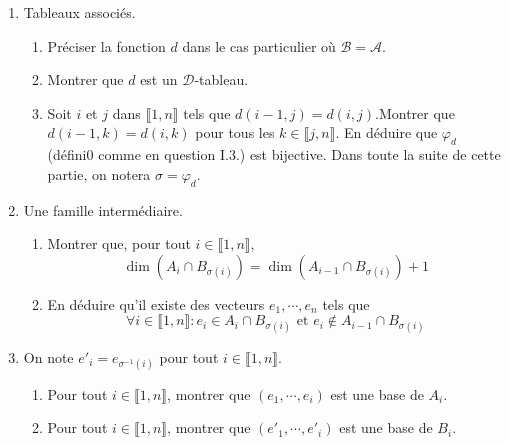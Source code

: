 \begin{enumerate}
  \item Tableaux associés.
\begin{enumerate}
  \item   Préciser la fonction $d$ dans le cas particulier où $\mathcal{B} = \mathcal{A}$.
  \item Montrer que $d$ est un $\mathcal{D}$-tableau.
  \item Soit $i$ et $j$ dans $\llbracket 1,n \rrbracket$ tels que $d(i-1,j)=d(i,j)$.\newline Montrer que $d(i-1,k)=d(i,k)$ pour tous les $k\in \llbracket j,n \rrbracket$. En déduire que $\varphi_d$ (défini0 comme en question I.3.) est bijective.
  \newline Dans toute la suite de cette partie, on notera $\sigma = \varphi_d$.
\end{enumerate}

  \item Une famille intermédiaire.
\begin{enumerate}
  \item Montrer que, pour tout $i \in \llbracket 1,n \rrbracket$,
  \begin{displaymath}
    \dim(A_i \cap B_{\sigma(i)}) = \dim(A_{i-1} \cap B_{\sigma(i)}) +1
  \end{displaymath}
  \item En déduire qu'il existe des vecteurs $e_1,\cdots,e_n$ tels que 
\begin{displaymath}
  \forall i \in \llbracket 1,n \rrbracket: e_i\in A_i \cap B_{\sigma(i)} \text{ et } e_i \notin A_{i-1} \cap B_{\sigma(i)}
\end{displaymath}
\end{enumerate}
  
  \item On note $e'_i = e_{\sigma^{-1}(i)}$ pour tout $i \in \llbracket 1,n \rrbracket$.
\begin{enumerate}
  \item Pour tout $i\in \llbracket 1,n \rrbracket$, montrer que $(e_1,\cdots, e_i)$ est une base de $A_i$.
  \item Pour tout $i\in \llbracket 1,n \rrbracket$, montrer que $(e'_1,\cdots, e'_i)$ est une base de $B_i$.
\end{enumerate}

  

\end{enumerate}


